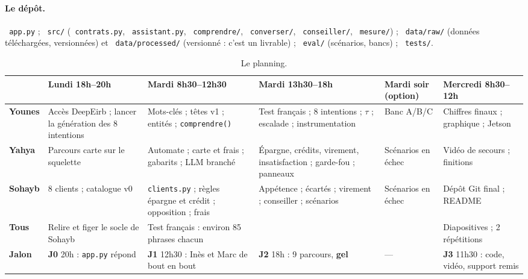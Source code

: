 \documentclass[11pt,a4paper]{article}
\DeclareRobustCommand{\f}[1]{{\texttt{\small
  \renewcommand{\_}{\char`\_\allowbreak}#1}}}
\begin{document}
\paragraph{Le dépôt.} \f{app.py} ; \f{src/} (\f{contrats.py}, \f{assistant.py},
\f{comprendre/}, \f{converser/}, \f{conseiller/}, \f{mesure/}) ; \f{data/raw/} (données téléchargées, versionnées) et
\f{data/processed/} (versionné : c'est un livrable) ; \f{eval/} (scénarios, bancs) ; \f{tests/}.

\begin{table}[H]
\centering\scriptsize
\renewcommand{\arraystretch}{1.2}
\begin{tabularx}{\textwidth}{@{}L{1.3cm} Y Y Y Y Y@{}}
\toprule
& \textbf{Lundi 18h--20h} & \textbf{Mardi 8h30--12h30} & \textbf{Mardi 13h30--18h}
  & \textbf{Mardi soir (option)} & \textbf{Mercredi 8h30--12h} \\
\midrule
\textbf{Younes} & Accès DeepEirb ; lancer la génération des 8 intentions
  & Mots-clés ; têtes v1 ; entités ; \texttt{comprendre()}
  & Test français ; 8 intentions ; $\tau$ ; escalade ; instrumentation
  & Banc A/B/C
  & Chiffres finaux ; graphique ; Jetson \\
\textbf{Yahya} & Parcours carte sur le squelette
  & Automate ; carte et frais ; gabarits ; LLM branché
  & Épargne, crédits, virement, insatisfaction ; garde-fou ; panneaux
  & Scénarios en échec
  & Vidéo de secours ; finitions \\
\textbf{Sohayb} & 8 clients ; catalogue v0
  & \texttt{clients.py} ; règles épargne et crédit ; opposition ; frais
  & Appétence ; écartés ; virement ; conseiller ; scénarios
  & Scénarios en échec
  & Dépôt Git final ; README \\
\textbf{Tous} & Relire et figer le socle de Sohayb & Test français :
  environ 85 phrases chacun & & & Diapositives ; 2 répétitions \\
\midrule
\textbf{Jalon} & \textcolor{kored}{\textbf{J0}} 20h : \texttt{app.py} répond &
  \textcolor{kored}{\textbf{J1}} 12h30 : Inès et Marc de bout en bout &
  \textcolor{kored}{\textbf{J2}} 18h : 9 parcours, \textbf{gel} & --- &
  \textcolor{kored}{\textbf{J3}} 11h30 : code, vidéo, support remis \\
\bottomrule
\end{tabularx}
\caption{Le planning.}
\end{table}
\end{document}

